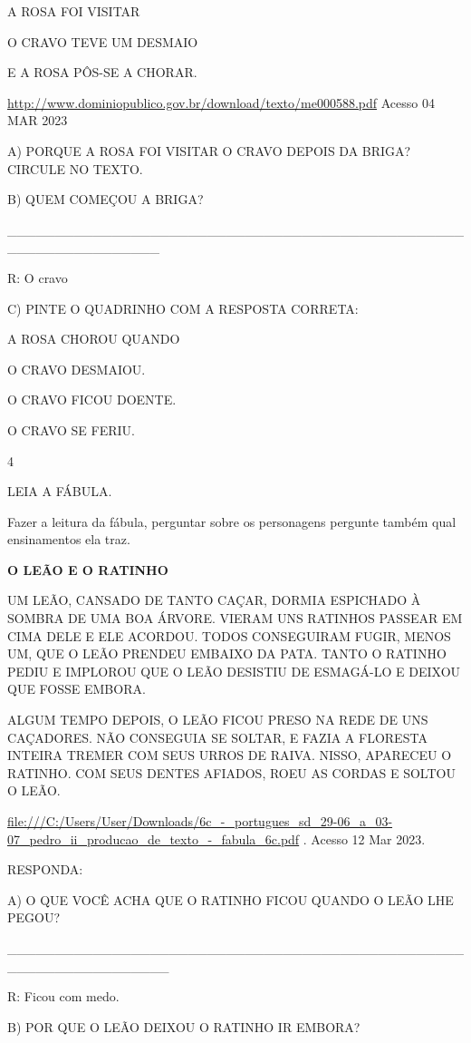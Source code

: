 {{{{{{A ROSA FOI VISITAR

O CRAVO TEVE UM DESMAIO

E A ROSA PÔS-SE A CHORAR.

\url{http://www.dominiopublico.gov.br/download/texto/me000588.pdf}
Acesso 04 MAR 2023

A) PORQUE A ROSA FOI VISITAR O CRAVO DEPOIS DA BRIGA? CIRCULE NO TEXTO.

B) QUEM COMEÇOU A BRIGA?

\_\_\_\_\_\_\_\_\_\_\_\_\_\_\_\_\_\_\_\_\_\_\_\_\_\_\_\_\_\_\_\_\_\_\_\_\_\_\_\_\_\_\_\_\_\_\_\_\_\_\_\_\_\_\_\_\_\_\_\_\_\_\_\_

R: O cravo

C) PINTE O QUADRINHO COM A RESPOSTA CORRETA:

A ROSA CHOROU QUANDO

O CRAVO DESMAIOU.

O CRAVO FICOU DOENTE.

O CRAVO SE FERIU.

\num{4}

LEIA A FÁBULA.

Fazer a leitura da fábula, perguntar sobre os personagens pergunte
também qual ensinamentos ela traz.

\textbf{O LEÃO E O RATINHO}

UM LEÃO, CANSADO DE TANTO CAÇAR, DORMIA ESPICHADO À SOMBRA DE UMA BOA
ÁRVORE. VIERAM UNS RATINHOS PASSEAR EM CIMA DELE E ELE ACORDOU. TODOS
CONSEGUIRAM FUGIR, MENOS UM, QUE O LEÃO PRENDEU EMBAIXO DA PATA. TANTO O
RATINHO PEDIU E IMPLOROU QUE O LEÃO DESISTIU DE ESMAGÁ-LO E DEIXOU QUE
FOSSE EMBORA.

ALGUM TEMPO DEPOIS, O LEÃO FICOU PRESO NA REDE DE UNS CAÇADORES. NÃO
CONSEGUIA SE SOLTAR, E FAZIA A FLORESTA INTEIRA TREMER COM SEUS URROS DE
RAIVA. NISSO, APARECEU O RATINHO. COM SEUS DENTES AFIADOS, ROEU AS
CORDAS E SOLTOU O LEÃO.

\url{file:///C:/Users/User/Downloads/6c_-_portugues_sd_29-06_a_03-07_pedro_ii_producao_de_texto_-_fabula_6c.pdf}
. Acesso 12 Mar 2023.

RESPONDA:

A) O QUE VOCÊ ACHA QUE O RATINHO FICOU QUANDO O LEÃO LHE PEGOU?

\_\_\_\_\_\_\_\_\_\_\_\_\_\_\_\_\_\_\_\_\_\_\_\_\_\_\_\_\_\_\_\_\_\_\_\_\_\_\_\_\_\_\_\_\_\_\_\_\_\_\_\_\_\_\_\_\_\_\_\_\_\_\_\_\_

R: Ficou com medo.

B) POR QUE O LEÃO DEIXOU O RATINHO IR EMBORA?

}}}}}}
